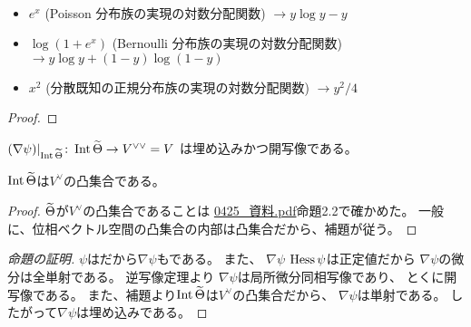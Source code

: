 \documentclass[report]{jlreq}
\begin{document}
\begin{example}[凸共役の例]
    ~
    \begin{itemize}
        \item $e^x$ (Poisson 分布族の実現の対数分配関数)
            $\to y \log y - y$
        \item $\log (1 + e^x)$ (Bernoulli 分布族の実現の対数分配関数)
            $\to y \log y + (1 - y) \log (1 - y)$
        \item $x^2$ (分散既知の正規分布族の実現の対数分配関数)
            $\to y^2 / 4$
    \end{itemize}
\end{example}

\begin{proposition}[凸共役の性質]
    \TODO{}
\end{proposition}

\begin{proof}
\end{proof}

\begin{proposition}
    $(\nabla \psi)|_{\operatorname{Int} \widetilde{\Theta}}
        \colon \operatorname{Int} \widetilde{\Theta} \to V^{\vee\vee} = V$
    は{\smooth}埋め込みかつ開写像である。
\end{proposition}

\begin{lemma}
    $\operatorname{Int} \widetilde{\Theta}$は$V^\vee$の凸集合である。
\end{lemma}

\begin{proof}
    $\widetilde{\Theta}$が$V^\vee$の凸集合であることは
    \url{0425_資料.pdf}命題2.2で確かめた。
    一般に、位相ベクトル空間の凸集合の内部は凸集合だから、補題が従う。
\end{proof}

\begin{proof}[命題の証明]
    $\psi$は{\smooth}だから$\nabla \psi$も{\smooth}である。
    また、
    $\nabla \psi$
    $\operatorname{Hess} \psi$は正定値だから
    $\nabla \psi$の微分は全単射である。
    逆写像定理より
    $\nabla \psi$は局所微分同相写像であり、
    とくに開写像である。
    また、補題より$\operatorname{Int} \widetilde{\Theta}$は$V^\vee$の凸集合だから、
    $\nabla \psi$は単射である。
    したがって$\nabla \psi$は埋め込みである。
\end{proof}
\end{document}
